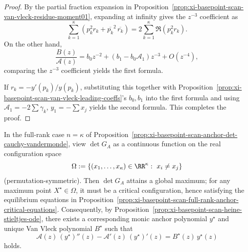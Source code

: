 \begin{proof}
By the partial fraction expansion in Proposition~\ref{prop:xi-basepoint-scan-van-vleck-residue-moment01}, expanding at infinity gives the \(z^{-3}\) coefficient as
\[
\sum_{k=1}^{\kappa}(p_k^2 r_k+\overline{p_k}^2\,\overline{r_k})
=2\sum_{k=1}^{\kappa}\Re(p_k^2 r_k).
\]
On the other hand,
\[
\frac{B(z)}{\mathcal{A}(z)}
=b_0 z^{-2}+(b_1-b_0\mathcal{A}_1)z^{-3}+O(z^{-4}),
\]
comparing the \(z^{-3}\) coefficient yields the first formula.
\par
If \(r_k=-y'(p_k)/y(p_k)\), substituting this together with Proposition~\ref{prop:xi-basepoint-scan-van-vleck-leading-coeffs}'s \(b_0,b_1\) into the first formula and using \(\mathcal{A}_1=-2\sum\gamma_k\), \(y_1=-\sum x_j\) yields the second formula. This completes the proof.
\end{proof}
\begin{proposition}\label{prop:xi-basepoint-scan-anchor-det-global-maximum}
In the full-rank case \(n=\kappa\) of Proposition~\ref{prop:xi-basepoint-scan-anchor-det-cauchy-vandermonde}, view \(\det G_A\) as a continuous function on the real configuration space
\[
\Omega:=\{(x_1,\dots,x_\kappa)\in\RR^\kappa:\ x_i\neq x_j\}
\]
(permutation-symmetric).
Then \(\det G_A\) attains a global maximum; for any maximum point \(X^\star\in\Omega\), it must be a critical configuration, hence satisfying the equilibrium equations in Proposition~\ref{prop:xi-basepoint-scan-full-rank-anchor-critical-equations}.
Consequently, by Proposition~\ref{prop:xi-basepoint-scan-heine-stieltjes-ode}, there exists a corresponding monic anchor polynomial \(y^\star\) and unique Van Vleck polynomial \(B^\star\) such that
\[
\mathcal{A}(z)\,(y^\star)''(z)-\mathcal{A}'(z)\,(y^\star)'(z)=B^\star(z)\,y^\star(z)
\]
holds.
\end{proposition}
